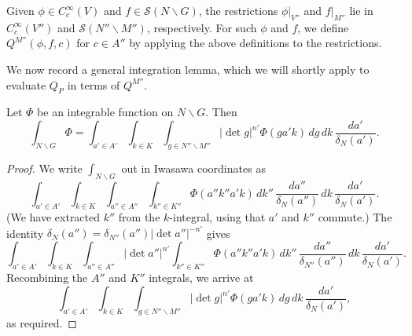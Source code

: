 Given $\phi \in C_c^\infty(V)$ and $f \in \mathcal{S}(N \backslash G)$, the restrictions $\phi|_{V''}$ and $f|_{M''}$ lie in $C_c^\infty(V'')$ and $\mathcal{S}(N'' \backslash M'')$, respectively.  For such $\phi$ and $f$, we define $Q^{M''}(\phi,f,c)$ for $c \in A''$ by applying the above definitions to the restrictions.

We now record a general integration lemma, which we will shortly apply to evaluate $Q_P$ in terms of $Q^{M''}$.

\begin{lemma}\label{lem:standard:rewrite-N-G-via-M}
  Let $\Phi$ be an integrable function on $N \backslash G$.  Then
  \begin{equation*}
    \int_{N \backslash G} \Phi
    =
    \int_{a ' \in A'}
    \int_{k \in K}
    \int_{g \in N'' \backslash M''}
    |\det g|^{n'}
    \Phi (g a' k)
    \, d g
    \, d k \, \frac{d a '}{\delta_N(a')}.
  \end{equation*}
\end{lemma}
\begin{proof}
  We write $\int_{N \backslash G}$ out in Iwasawa coordinates as
  \begin{equation*}
    \int_{a' \in A'}
    \int_{k \in K}
    \int_{a'' \in A''}
    \int_{k'' \in K'' }
    \Phi (a'' k'' a' k)
    \, d k''
    \, \frac{d a''}{\delta_N(a'')}
    \, d k
    \, \frac{d a'}{\delta_N (a')}.
  \end{equation*}
  (We have extracted $k''$ from the $k$-integral, using that $a'$ and $k''$ commute.)  The identity $\delta_N(a'') = \delta_{N''}(a'') |\det a''|^{-n'}$ gives
  \begin{equation*}
    \int_{a' \in A'}
    \int_{k \in K}
    \int_{a'' \in A''}
    |\det a''|^{n'}
    \int_{k'' \in K'' }
    \Phi( a'' k'' a' k)
    \, d k''
    \, \frac{d a''}{\delta_{N''}(a'')}
    \, d k
    \, \frac{d a'}{\delta_N (a')}.
  \end{equation*}
  Recombining the $A''$ and $K''$ integrals, we arrive at
  \begin{equation*}
    \int_{a' \in A'}
    \int_{k \in K}
    \int_{g \in N'' \backslash M''}
    |\det g|^{n'}
    \Phi(g a' k)
    \, d g
    \, d k
    \, \frac{d a'}{\delta_N (a')},
  \end{equation*}
  as required.
\end{proof}

